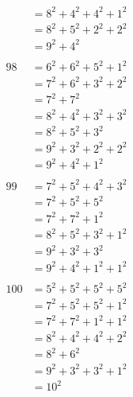 \documentclass{article}
\numberwithin{equation}{section}
\begin{document}
\begin{multicols}{3}
\begin{align*}
   & = 8^2 + 4^2 + 4^2 + 1^2\\
   & = 8^2 + 5^2 + 2^2 + 2^2\\
   & = 9^2 + 4^2\\
\\
98 & = 6^2 + 6^2 + 5^2 + 1^2\\
   & = 7^2 + 6^2 + 3^2 + 2^2\\
   & = 7^2 + 7^2\\
   & = 8^2 + 4^2 + 3^2 + 3^2\\
   & = 8^2 + 5^2 + 3^2\\
   & = 9^2 + 3^2 + 2^2 + 2^2\\
   & = 9^2 + 4^2 + 1^2\\
\\
99 & = 7^2 + 5^2 + 4^2 + 3^2\\
   & = 7^2 + 5^2 + 5^2\\
   & = 7^2 + 7^2 + 1^2\\
   & = 8^2 + 5^2 + 3^2 + 1^2\\
   & = 9^2 + 3^2 + 3^2\\
   & = 9^2 + 4^2 + 1^2 + 1^2\\
\\
100 & = 5^2 + 5^2 + 5^2 + 5^2\\
    & = 7^2 + 5^2 + 5^2 + 1^2\\
    & = 7^2 + 7^2 + 1^2 + 1^2\\
    & = 8^2 + 4^2 + 4^2 + 2^2\\
    & = 8^2 + 6^2\\
    & = 9^2 + 3^2 + 3^2 + 1^2\\
    & = 10^2
\end{align*}
\end{multicols}
\end{document}
